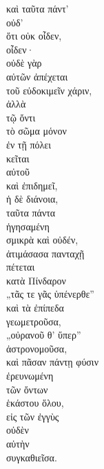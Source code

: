 {\large
\begin{greek}
\noindent καὶ ταῦτα πάντ' \\
\tabto{2em} οὐδ' \\
\tabto{4em} ὅτι οὐκ οἶδεν, \\
\tabto{2em} οἶδεν· \\
\tabto{2em} οὐδὲ γὰρ \\
\tabto{4em} αὐτῶν ἀπέχεται \\
\tabto{6em} τοῦ εὐδοκιμεῖν χάριν, \\

\tabto{2em} ἀλλὰ \\
\tabto{2em} τῷ ὄντι \\
\tabto{2em} τὸ σῶμα μόνον \\
\tabto{4em} ἐν τῇ πόλει \\
\tabto{2em} κεῖται \\
\tabto{4em} αὐτοῦ \\
\tabto{2em} καὶ ἐπιδημεῖ, \\
\tabto{2em} ἡ δὲ διάνοια, \\
\tabto{4em} ταῦτα πάντα \\
\tabto{2em} ἡγησαμένη \\
\tabto{4em} σμικρὰ καὶ οὐδέν, \\
\tabto{2em} ἀτιμάσασα πανταχῇ \\
\tabto{2em} πέτεται \\
\tabto{4em} κατὰ Πίνδαρον \\
\tabto{2em} „τᾶς τε γᾶς ὑπένερθε”\\
\tabto{2em} καὶ τὰ ἐπίπεδα \\
\tabto{4em} γεωμετροῦσα, \\
\tabto{2em}  „οὐρανοῦ θ' ὕπερ”\\
\tabto{4em} ἀστρονομοῦσα, \\
\tabto{2em} καὶ πᾶσαν πάντῃ φύσιν \\
\tabto{4em} ἐρευνωμένη \\
\tabto{6em} τῶν ὄντων \\
\tabto{8em} ἑκάστου ὅλου, \\
\tabto{2em} εἰς τῶν ἐγγὺς \\
\tabto{4em} οὐδὲν \\
\tabto{4em} αὑτὴν \\
\tabto{4em} συγκαθιεῖσα.\\

\end{greek}
}

